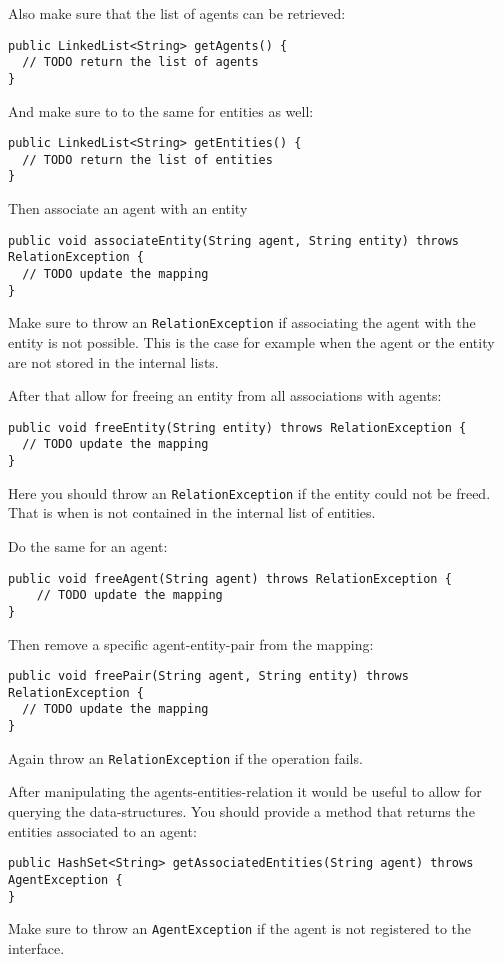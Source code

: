 \documentclass[a4]{article}
\begin{document}
Also make sure that the list of agents can be retrieved:
\begin{verbatim}
public LinkedList<String> getAgents() {
  // TODO return the list of agents
}
\end{verbatim}

And make sure to to the same for entities as well:
\begin{verbatim}
public LinkedList<String> getEntities() {
  // TODO return the list of entities
}
\end{verbatim}

Then associate an agent with an entity
\begin{verbatim}
public void associateEntity(String agent, String entity) throws RelationException {
  // TODO update the mapping
}
\end{verbatim}
Make sure to throw an \texttt{RelationException} if associating the agent with the entity is not possible.
This is the case for example when the agent or the entity are not stored in the internal lists. 

After that allow for freeing an entity from all associations with agents:
\begin{verbatim}
public void freeEntity(String entity) throws RelationException {
  // TODO update the mapping
}
\end{verbatim}
Here you should throw an \texttt{RelationException} if the entity could not be freed. 
That is when is not contained in the internal list of entities.

Do the same for an agent:
\begin{verbatim}
public void freeAgent(String agent) throws RelationException {
    // TODO update the mapping
}
\end{verbatim}

Then remove a specific agent-entity-pair from the mapping:
\begin{verbatim}
public void freePair(String agent, String entity) throws RelationException {
  // TODO update the mapping
}
\end{verbatim}
Again throw an \texttt{RelationException} if the operation fails.

After manipulating the agents-entities-relation it would be useful to allow for querying the data-structures.
You should provide a method that returns the entities associated to an agent:
\begin{verbatim}
public HashSet<String> getAssociatedEntities(String agent) throws AgentException {
}
\end{verbatim}
Make sure to throw an \texttt{AgentException} if the agent is not registered to the interface.
\end{document}
